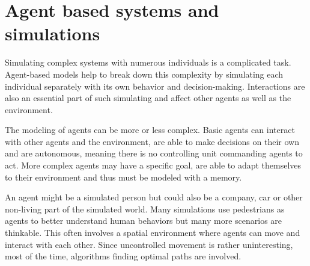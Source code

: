 \section{Agent based systems and simulations}

	Simulating complex systems with numerous individuals is a complicated task.
	Agent-based models help to break down this complexity by simulating each individual separately with its own behavior and decision-making. \cite{macal2014introductory}
	Interactions are also an essential part of such simulating and affect other agents as well as the environment.
	
	The modeling of agents can be more or less complex.
	Basic agents can interact with other agents and the environment, are able to make decisions on their own and are autonomous, meaning there is no controlling unit commanding agents to act.
	More complex agents may have a specific goal, are able to adapt themselves to their environment and thus must be modeled with a memory.
	
	An agent might be a simulated person but could also be a company, car or other non-living part of the simulated world.
	Many simulations use pedestrians as agents to better understand human behaviors but many more scenarios are thinkable\cite[8]{macal2014introductory}.
	This often involves a spatial environment where agents can move and interact with each other.
	Since uncontrolled movement is rather uninteresting, most of the time, algorithms finding optimal paths are involved\cite{kneidl-borrmann-hartmann-navigation,gloor-hybrid-pedestrian-routing,teknomo-millonig-routing}.
	
